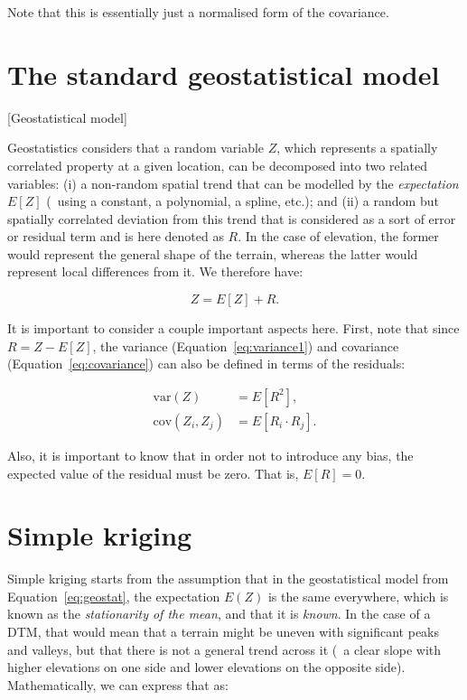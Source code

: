 Note that this is essentially just a normalised form of the covariance.

\section{The standard geostatistical model}[Geostatistical model]

Geostatistics considers that a random variable \(Z\), which represents a spatially correlated property at a given location, can be decomposed into two related variables: (i) a non-random spatial trend that can be modelled by the \emph{expectation} \(E[Z]\) (\eg\ using a constant, a polynomial, a spline, etc.); and (ii) a random but spatially correlated deviation from this trend that is considered as a sort of error or residual term and is here denoted as \(R\).
In the case of elevation, the former would represent the general shape of the terrain, whereas the latter would represent local differences from it.
We therefore have:

\begin{equation}
\label{eq:geostat}
Z = E\left[Z\right] + R.
\end{equation}

It is important to consider a couple important aspects here.
First, note that since \(R = Z - E[Z] \), the variance (Equation~\ref{eq:variance1}) and covariance (Equation~\ref{eq:covariance}) can also be defined in terms of the residuals:

\begin{align}
\mathrm{var}\left(Z\right) &= E\left[{R}^2\right], \label{eq:varres} \\
\mathrm{cov}(Z_i,Z_j) &= E\left[R_i \cdot R_j\right]. \label{eq:covres}
\end{align}

Also, it is important to know that in order not to introduce any bias, the expected value of the residual must be zero.
That is, \(E\left[R\right] = 0\).

\section{Simple kriging}

Simple kriging starts from the assumption that in the geostatistical model from Equation~\ref{eq:geostat}, the expectation \(E(Z)\) is the same everywhere, which is known as the \emph{stationarity of the mean}, and that it is \emph{known}.
In the case of a DTM, that would mean that a terrain might be uneven with significant peaks and valleys, but that there is not a general trend across it (\eg\ a clear slope with higher elevations on one side and lower elevations on the opposite side).
Mathematically, we can express that as:

